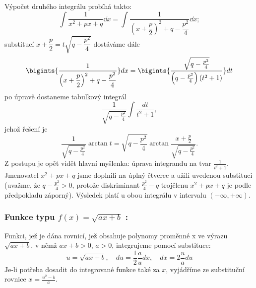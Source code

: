       Výpočet druhého integrálu probíhá takto: 
      \begin{equation}\label{MA:int_ex_10}
        \int\dfrac{1}{x^2+px+q}\dd{x} = 
          \int\dfrac{1}{\left(x+\dfrac{p}{2}\right)^2 + q - \dfrac{p^2}{4}}\dd{x};
      \end{equation}
      substitucí $x+\dfrac{p}{2} = t\sqrt{q - \dfrac{p^2}{4}}$ dostáváme dále
      \begin{gather*}\label{MA:int_ex_11}
        \bigints{\frac{1}{\displaystyle{\left(x+\frac{p}{2}\right)^2 + q - \frac{p^2}{4}}}}dx 
          =\displaystyle{
            \bigints{
              \frac{\sqrt{q-\frac{p^2}{4}}}{\left(q-\frac{p^2}{4}\right)(t^2+1)}}dt
            }   
      \end{gather*}
      po úpravě dostaneme tabulkový integrál
      \begin{equation}\label{MA:int_ex_12}
        \frac{1}{\sqrt{q-\frac{p^2}{4}}}\int{\frac{dt}{t^2+1}},
      \end{equation}
      jehož řešení je  
      \begin{equation*}\label{MA:int_ex_13}
        \frac{1}{\sqrt{q-\frac{p^2}{4}}}\arctan{t} 
          = \sqrt{q-\frac{p^2}{4}}\arctan\frac{x+\frac{p}{2}}{\sqrt{q-\frac{p^2}{4}}}.     
      \end{equation*}   
      Z postupu je opět vidět hlavní myšlenka: úprava integrandu na tvar $\frac{1}{t^2+1}$.
      Jmenovatel $x^2+px+q$ jsme doplnili na úplný čtverec a užili uvedenou substituci (uvažme,
      že $q-\frac{p^2}{4}>0$, protože diskriminant $\frac{p^2}{4}-q$ trojčlenu $x^2+px+q$ je
      podle předpokladu záporný). Výsledek platí u obou integrálu v intervalu \((-\infty,
      +\infty)\).
      
      \subsubsection*{Funkce typu $\boxed{f(x)=\sqrt{ax+b}}$ :}
         Funkci, jež je dána rovnicí, jež obsahuje polynomy proměnné x  ve výrazu $\sqrt{ax+b}$,
         v němž $ax+b>0$, $a>0$, integrujeme pomocí substituce:
         \begin{equation}\label{ma:eq_sub_fce1}
             u=\sqrt{ax+b},\quad du=\frac{1}{2}\frac{a}{u}dx,\quad dx=2\frac{u}{a}du
         \end{equation}
         Je-li potřeba dosadit do integrované funkce také za $x$, vyjádříme ze substituční
         rovnice $x=\frac{u^2-b}{a}$.
